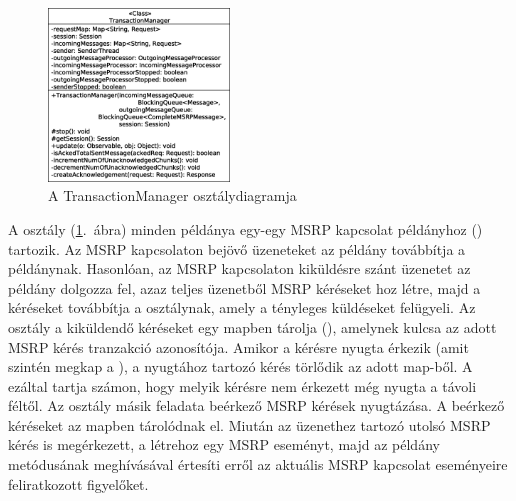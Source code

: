 \begin{figure}
  \vspace{-25pt}
  \begin{center}
    \includegraphics[width=0.43\textwidth]{img/class_diagrams/TransactionManager.eps}
  \end{center}
  \vspace{-15pt}
  \captionsetup{font=scriptsize}
  \caption{A TransactionManager osztálydiagramja}
   \label{fig:class_transactionmanager}
  \vspace{-10pt}
\end{figure}
A  osztály (\ref{fig:class_transactionmanager}.~ábra) minden példánya egy-egy MSRP kapcsolat példányhoz () tartozik. Az MSRP kapcsolaton bejövő üzeneteket az  példány továbbítja a  példánynak. Hasonlóan, az MSRP kapcsolaton kiküldésre szánt üzenetet az  példány dolgozza fel, azaz teljes üzenetből MSRP kéréseket hoz létre, majd a kéréseket továbbítja a  osztálynak, amely a tényleges küldéseket felügyeli. Az osztály a kiküldendő kéréseket egy mapben tárolja (), amelynek kulcsa az adott MSRP kérés tranzakció azonosítója. Amikor a kérésre nyugta érkezik (amit szintén megkap a ), a nyugtához tartozó kérés törlődik az adott map-ből. A  ezáltal tartja számon, hogy melyik kérésre nem érkezett még nyugta a távoli féltől. Az osztály másik feladata beérkező MSRP kérések nyugtázása. A beérkező kéréseket az  mapben tárolódnak el. Miután az üzenethez tartozó utolsó MSRP kérés is megérkezett, a  létrehoz egy MSRP eseményt, majd az  példány  metódusának meghívásával értesíti erről az aktuális MSRP kapcsolat eseményeire feliratkozott figyelőket.

